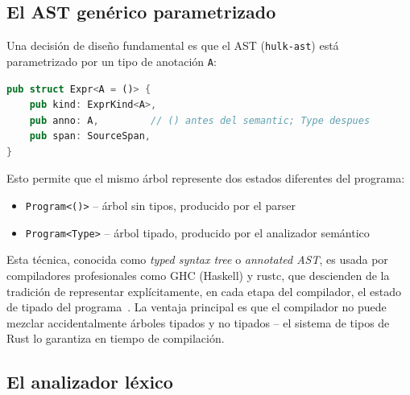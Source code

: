 \documentclass[12pt, a4paper]{article}
\begin{document}
\subsection{El AST gen\'{e}rico parametrizado}

Una decisi\'{o}n de dise\~{n}o fundamental es que el AST (\texttt{hulk-ast}) est\'{a}
parametrizado por un tipo de anotaci\'{o}n \texttt{A}:

\begin{lstlisting}[language=Rust, caption={AST gen\'{e}rico en Rust}, label=lst:ast-generic]
pub struct Expr<A = ()> {
    pub kind: ExprKind<A>,
    pub anno: A,         // () antes del semantic; Type despues
    pub span: SourceSpan,
}
\end{lstlisting}

Esto permite que el mismo \'{a}rbol represente dos estados diferentes del programa:
\begin{itemize}
    \item \texttt{Program<()>} -- \'{a}rbol sin tipos, producido por el parser
    \item \texttt{Program<Type>} -- \'{a}rbol tipado, producido por el analizador sem\'{a}ntico
\end{itemize}

Esta t\'{e}cnica, conocida como \textit{typed syntax tree} o \textit{annotated AST},
es usada por compiladores profesionales como GHC (Haskell) y rustc, que
descienden de la tradici\'{o}n de representar expl\'{i}citamente, en cada etapa
del compilador, el estado de tipado del programa~\cite{peytonjones1987}. La ventaja
principal es que el compilador no puede mezclar accidentalmente \'{a}rboles tipados
y no tipados -- el sistema de tipos de Rust lo garantiza en tiempo de compilaci\'{o}n.

\subsection{El analizador l\'{e}xico}
\end{document}
